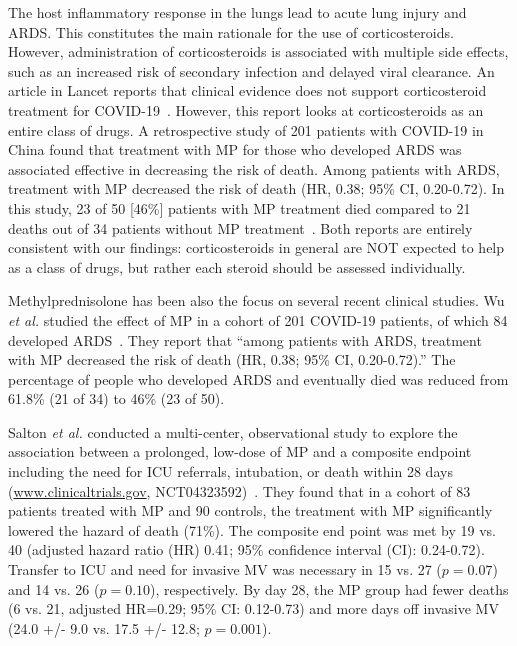 The host inflammatory response in the lungs lead to acute lung injury and ARDS. This constitutes the main rationale for the use of corticosteroids. However, administration of corticosteroids is associated with multiple side effects, such as an increased risk of secondary infection and delayed viral clearance. An article in Lancet reports that clinical evidence does not support corticosteroid treatment for COVID-19~\cite{russell2020clinical}. However, this report looks at corticosteroids as an entire class of drugs. A retrospective study of 201 patients with COVID-19 in China found that treatment with MP for those who developed ARDS was associated effective in decreasing the risk of death. Among patients with ARDS, treatment with MP decreased the risk of death (HR, 0.38; 95\% CI, 0.20-0.72). In this study, 23 of 50 [46\%] patients with MP treatment died compared to 21 deaths out of  34 patients without MP treatment~\cite{wu2020risk}. Both reports are entirely consistent with our findings: corticosteroids in general are NOT expected to help as a class of drugs, but rather each steroid should be assessed individually.


Methylprednisolone has been also the focus on several recent clinical studies. Wu \emph{et al.} studied the effect of MP  in a cohort of 201 COVID-19 patients, of which 84 developed ARDS~\cite{WuRiskFactorsCOVID:2020}.  They report that ``among patients with ARDS, treatment with MP decreased the risk of death (HR, 0.38; 95\% CI, 0.20-0.72).'' The percentage of people who developed ARDS and eventually died was reduced from  61.8\% (21 of 34) to 46\% (23 of 50).

Salton \emph{et al.}  conducted a multi-center, observational study to explore the association between a prolonged, low-dose of MP and a composite endpoint including the need for ICU referrals, intubation, or death within 28 days (\href{www.clinicaltrials.gov}{www.clinicaltrials.gov}, NCT04323592)~\cite{salton2020prolonged}. They found that in a cohort of 83 patients treated with MP and 90 controls, the treatment with MP significantly lowered the hazard of death (71\%). The composite end point was met by 19 vs. 40 (adjusted hazard ratio (HR) 0.41; 95\% confidence interval (CI): 0.24-0.72). Transfer to ICU and need for invasive MV was necessary in 15 vs. 27 ($p=0.07$) and 14 vs. 26 ($p=0.10$), respectively. By day 28, the MP group had fewer deaths (6 vs. 21, adjusted HR=0.29; 95\% CI: 0.12-0.73) and more days off invasive MV (24.0 +/- 9.0 vs. 17.5 +/- 12.8; $p=0.001$).


